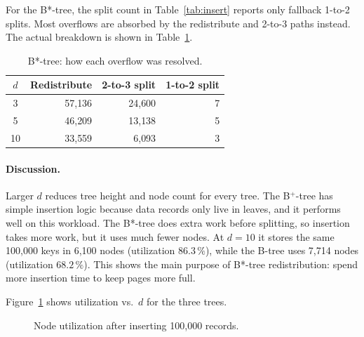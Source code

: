 \documentclass[sigconf]{acmart}
\begin{document}
For the B*-tree, the split count in Table~\ref{tab:insert} reports
only fallback 1-to-2 splits. Most overflows are absorbed by the
redistribute and 2-to-3 paths instead. The actual breakdown is shown
in Table~\ref{tab:bstar}.

\begin{table}[h]
\centering
\small
\caption{B*-tree: how each overflow was resolved.}
\label{tab:bstar}
\begin{tabular}{c rrr}
\toprule
$d$ & Redistribute & 2-to-3 split & 1-to-2 split \\
\midrule
3  & 57{,}136 & 24{,}600 & 7 \\
5  & 46{,}209 & 13{,}138 & 5 \\
10 & 33{,}559 &  6{,}093 & 3 \\
\bottomrule
\end{tabular}
\end{table}

\paragraph{Discussion.} Larger $d$ reduces tree height and node count
for every tree. The B$^+$-tree has simple insertion logic because data
records only live in leaves, and it performs well on this workload.
The B*-tree does extra work before splitting, so insertion takes more
work, but it uses much fewer nodes. At $d=10$ it
stores the same 100{,}000 keys in 6{,}100 nodes (utilization
$86.3\,\%$), while the B-tree uses 7{,}714 nodes (utilization
$68.2\,\%$). This shows the main purpose of B*-tree redistribution:
spend more insertion time to keep pages more full.

Figure~\ref{fig:util} shows utilization vs.\ $d$ for the three trees.

\begin{figure}[h]
\centering
{}
\caption{Node utilization after inserting 100{,}000 records.}
\label{fig:util}
\end{figure}
\end{document}
